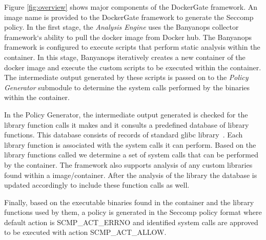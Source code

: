 Figure \ref{fig:overview} shows major components of the DockerGate framework. An image name is provided to the DockerGate framework to generate the Seccomp policy. In the first stage, the \textit{Analysis Engine} uses the Banyanops collector framework`s ability to pull the docker image from Docker hub. The Banyanops framework is configured to execute scripts that perform static analysis within the container. In this stage, Banyanops iteratively creates a new container of the docker image and execute the custom scripts to be executed within the container.
The intermediate output generated by these scripts is passed on to the \textit{Policy Generator} submodule to determine the system calls performed by the binaries within the container. 

In the Policy Generator, the intermediate output generated is checked for the library function calls it makes and it consults a predefined database of library functions. This database consists of records of standard glibc library~\cite{glibc}. Each library function is associated with the system calls it can perform. Based on the library functions called we determine a set of system calls that can be performed by the container. 
 The framework also supports analysis of any custom libraries found within a image/container. After the analysis of the library the database is updated accordingly to include these function calls as well.

Finally, based on the executable binaries found in the container and the library functions used by them, a policy is generated in the Seccomp policy format where default action is SCMP\_ACT\_ERRNO and identified system calls are approved to be executed with action SCMP\_ACT\_ALLOW.




